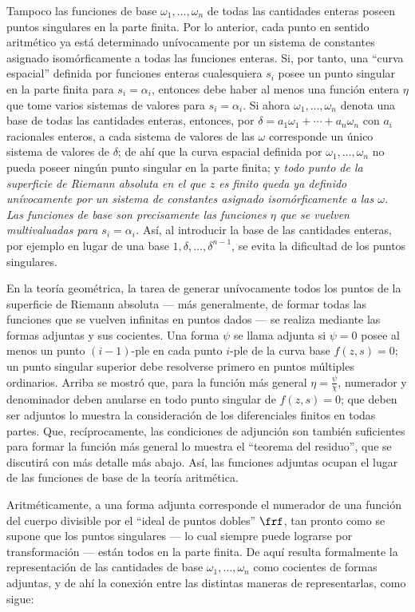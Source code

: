 \documentclass[11pt]{article}
\begin{document}
Tampoco las funciones de base \(\omega_1,\ldots,\omega_n\) de todas las cantidades enteras poseen puntos singulares en la parte finita. Por lo anterior, cada punto en sentido aritmético ya está determinado unívocamente por un sistema de constantes asignado isomórficamente a todas las funciones enteras. Si, por tanto, una ``curva espacial'' definida por funciones enteras cualesquiera \(s_i\) posee un punto singular en la parte finita para \(s_i=\alpha_i\), entonces debe haber al menos una función entera \(\eta\) que tome varios sistemas de valores para \(s_i=\alpha_i\). Si ahora \(\omega_1,\ldots,\omega_n\) denota una base de todas las cantidades enteras, entonces, por \(\delta=a_1\omega_1+\cdots+a_n\omega_n\) con \(a_i\) racionales enteros, a cada sistema de valores de las \(\omega\) corresponde un único sistema de valores de \(\delta\); de ahí que la curva espacial definida por \(\omega_1,\ldots,\omega_n\) no pueda poseer ningún punto singular en la parte finita; y \emph{todo punto de la superficie de Riemann absoluta en el que \(z\) es finito queda ya definido unívocamente por un sistema de constantes asignado isomórficamente a las \(\omega\). Las funciones de base son precisamente las funciones \(\eta\) que se vuelven multivaluadas para \(s_i=\alpha_i\).} Así, al introducir la base de las cantidades enteras, por ejemplo en lugar de una base \(1,\delta,\ldots,\delta^{n-1}\), se evita la dificultad de los puntos singulares.

En la teoría geométrica, la tarea de generar unívocamente todos los puntos de la superficie de Riemann absoluta --- más generalmente, de formar todas las funciones que se vuelven infinitas en puntos dados --- se realiza mediante las formas adjuntas y sus cocientes. Una forma \(\psi\) se llama adjunta si \(\psi=0\) posee al menos un punto \((i-1)\)-ple en cada punto \(i\)-ple de la curva base \(f(z,s)=0\); un punto singular superior debe resolverse primero en puntos múltiples ordinarios. Arriba se mostró que, para la función más general \(\eta=\frac{\psi}{\chi}\), numerador y denominador deben anularse en todo punto singular de \(f(z,s)=0\); que deben ser adjuntos lo muestra la consideración de los diferenciales finitos en todas partes. Que, recíprocamente, las condiciones de adjunción son también suficientes para formar la función más general lo muestra el ``teorema del residuo'', que se discutirá con más detalle más abajo. Así, las funciones adjuntas ocupan el lugar de las funciones de base de la teoría aritmética.

Aritméticamente, a una forma adjunta corresponde el numerador de una función del cuerpo divisible por el ``ideal de puntos dobles'' \(\frf\), tan pronto como se supone que los puntos singulares --- lo cual siempre puede lograrse por transformación --- están todos en la parte finita. De aquí resulta formalmente la representación de las cantidades de base \(\omega_1,\ldots,\omega_n\) como cocientes de formas adjuntas, y de ahí la conexión entre las distintas maneras de representarlas, como sigue:
\end{document}
